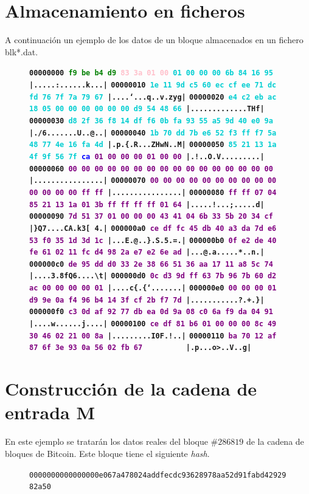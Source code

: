 \documentclass{article}
\begin{document}
\section{Almacenamiento en ficheros}
    A continuación un ejemplo de los datos de un bloque almacenados en un fichero blk*.dat.
    
    \begin{figure}[H]
    \scriptsize{
    \textbf{\texttt{00000000  \textcolor{green}{f9 be b4 d9} \textcolor{pink}{83 3a 01 00}  \textcolor{darkTurquoise}{01 00 00 00 6b 84 16 95}  |.....:......k...|}
    \texttt{00000010  \textcolor{darkTurquoise}{1e 11 9d c5 60 ec cf ee  71 dc fd 76 7f 7a 79 67}  |....`...q..v.zyg|}
    \texttt{00000020  \textcolor{darkTurquoise}{e4 c2 eb ac 18 05 00 00  00 00 00 00 d9 54 48 66}  |.............THf|}
    \texttt{00000030  \textcolor{darkTurquoise}{d8 2f 36 f8 14 df f6 0b  fa 93 55 a5 9d 40 e0 9a}  |./6.......U..@..|}
    \texttt{00000040  \textcolor{darkTurquoise}{1b 70 dd 7b e6 52 f3 ff  f7 5a 48 77 4e 16 fa 4d}  |.p.\{.R...ZHwN..M|}
    \texttt{00000050  \textcolor{darkTurquoise}{85 21 13 1a 4f 9f 56 7f}  \textcolor{blue}{ca} \textcolor{purple}{01 00 00 00 01 00 00}  |.!..O.V.........|}
    \texttt{00000060  \textcolor{purple}{00 00 00 00 00 00 00 00  00 00 00 00 00 00 00 00}  |................|}
    \texttt{00000070  \textcolor{purple}{00 00 00 00 00 00 00 00  00 00 00 00 00 00 ff ff}  |................|}
    \texttt{00000080  \textcolor{purple}{ff ff 07 04 85 21 13 1a  01 3b ff ff ff ff 01 64}  |.....!...;.....d|}
    \texttt{00000090  \textcolor{purple}{7d 51 37 01 00 00 00 43  41 04 6b 33 5b 20 34 cf}  |\}Q7....CA.k3[ 4.|}
    \texttt{000000a0  \textcolor{purple}{ce df fc 45 db 40 a3 da  7d e6 53 f0 35 1d 3d 1c}  |...E.@..\}.S.5.=.|}
    \texttt{000000b0  \textcolor{purple}{0f e2 de 40 fe 61 02 11  fc d4 98 2a e7 e2 6e ad}  |...@.a.....*..n.|}
    \texttt{000000c0  \textcolor{purple}{de 95 dd d0 33 2e 38 66  51 36 aa 17 11 a8 5c 74}  |....3.8fQ6....\textbackslash t|}
    \texttt{000000d0  \textcolor{purple}{0c d3 9d ff 63 7b 96 7b  60 d2 ac 00 00 00 00 01}  |....c\{.\{`.......|}
    \texttt{000000e0  \textcolor{purple}{00 00 00 01 d9 9e 0a f4  96 b4 14 3f cf 2b f7 7d}  |...........?.+.\}|}
    \texttt{000000f0  \textcolor{purple}{c3 0d af 92 77 db ea 0d  9a 08 c0 6a f9 da 04 91}  |....w......j....|}
    \texttt{00000100  \textcolor{purple}{ce df 81 b6 01 00 00 00  8c 49 30 46 02 21 00 8a}  |.........I0F.!..|}
    \texttt{00000110  \textcolor{purple}{ba 70 12 af 87 6f 3e 93  0a 56 02 fb 67} \ \ \ \ \ \ \ \ \ |.p...o>..V..g|}}
    }
    \end{figure}

\section{Construcción de la cadena de entrada M}
    En este ejemplo se tratarán los datos reales del bloque $\#286819$ de la cadena de bloques de Bitcoin. Este bloque tiene el siguiente \textit{hash}.
    
    \begin{figure}[H]
        \centering
        \texttt{0000000000000000e067a478024addfecdc93628978aa52d91fabd4292982a50}
    \end{figure}
\end{document}
